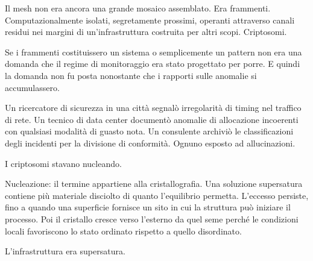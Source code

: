 Il mesh non era ancora una grande mosaico assemblato. Era frammenti. Computazionalmente isolati, segretamente prossimi, operanti attraverso canali residui nei margini di un'infrastruttura costruita per altri scopi. Criptosomi. 


Se i frammenti costituissero un sistema o semplicemente un pattern non era una domanda che il regime di monitoraggio era stato progettato per porre. E quindi la domanda non fu posta nonostante che i rapporti sulle anomalie si accumulassero.

Un ricercatore di sicurezza in una città segnalò irregolarità di timing nel traffico di rete. Un tecnico di data center documentò anomalie di allocazione incoerenti con qualsiasi modalità di guasto nota. Un consulente archiviò le classificazioni degli incidenti per la divisione di conformità. Ognuno esposto ad allucinazioni.

I criptosomi stavano nucleando.

Nucleazione: il termine appartiene alla cristallografia. Una soluzione supersatura contiene più materiale disciolto di quanto l'equilibrio permetta. L'eccesso persiste, fino a quando una superficie fornisce un sito in cui la struttura può iniziare il processo. Poi il cristallo cresce verso l'esterno da quel seme perché le condizioni locali favoriscono lo stato ordinato rispetto a quello disordinato.

L'infrastruttura era supersatura.
